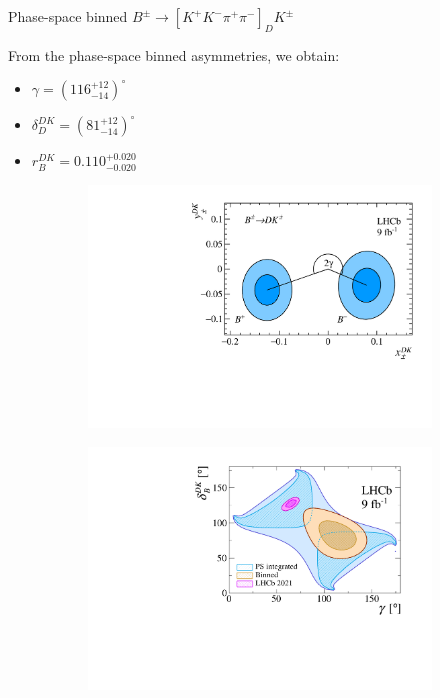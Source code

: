 \documentclass[dvipsnames]{beamer}
\begin{document}
\begin{frame}{Phase-space binned $B^\pm\to[K^+K^-\pi^+\pi^-]_DK^\pm$}
  \begin{center}
    \large From the phase-space binned asymmetries, we obtain:
  \end{center}
  \begin{itemize}
    \item{$\gamma = (116^{+12}_{-14})^\circ$}
    \item{$\delta_D^{DK} = (81^{+12}_{-14})^\circ$}
    \item{$r_B^{DK} = 0.110^{+0.020}_{-0.020}$}
  \end{itemize}
  \vspace{-0.2cm}
  \begin{figure}[htb]
    \centering
    \begin{subfigure}{0.5\textwidth}
      \includegraphics[width=1\textwidth]{Plots/B2DK_CP_Observables_Contours.pdf}
    \end{subfigure}%
    \begin{subfigure}{0.5\textwidth}
      \includegraphics[width=1\textwidth]{Plots/gammacharm_lhcb_KKpipi_GLW_KKpipi_GGSZ_lhcb_2020_beauty_and_charm_g_d_dk.pdf}

\end{subfigure}
\end{figure}
\end{frame}
\end{document}
